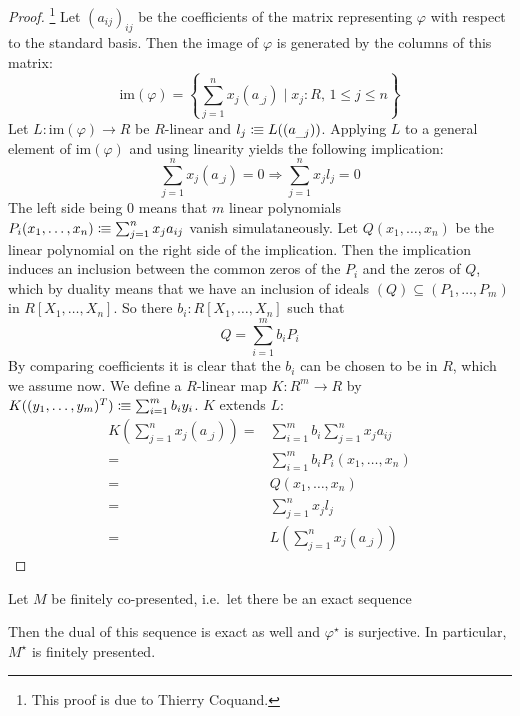 \begin{proof}\footnote{This proof is due to Thierry Coquand.}
  Let $(a_{ij})_{ij}$ be the coefficients of the matrix representing  $\varphi$ with respect to the standard basis.
  Then the image of $\varphi$ is generated by the columns of this matrix:
  \[
    \mathrm{im}(\varphi)=\left\{\sum_{j=1}^n x_j(a_{\_j})\mid x_j:R\text{, $1\leq j \leq n$}\right\}
  \]
  Let $L:\mathrm{im}(\varphi)\to R$ be $R$-linear and $l_j\vcentcolon\mspace{-1.2mu}\equiv L((a_{\_j}))$.
  Applying $L$ to a general element of $\mathrm{im}(\varphi)$ and using linearity yields the following implication:
  \[
    \sum_{j=1}^n x_j(a_{\_j}) = 0 \Rightarrow \sum_{j=1}^n x_jl_j = 0
  \]
  The left side being 0 means that $m$ linear polynomials $P_i(x_1,\dots,x_n)\vcentcolon\mspace{-1.2mu}\equiv\sum_{j=1}^n x_ja_{ij} $ vanish simulataneously.
  Let $Q(x_1,\dots,x_n)$ be the linear polynomial on the right side of the implication.
  Then the implication induces an inclusion between the common zeros of the $P_i$ and the zeros of $Q$,
  which by duality means that we have an inclusion of ideals $(Q)\subseteq (P_1,\dots,P_m)$ in $R[X_1,\dots,X_n]$.
  So there $b_i:R[X_1,\dots,X_n]$ such that
  \[
     Q = \sum_{i=1}^m b_iP_i
   \]
   By comparing coefficients it is clear that the $b_i$ can be chosen to be in $R$, which we assume now.
   We define a $R$-linear map $K:R^m\to R$ by $K((y_1,\dots,y_m)^T)\vcentcolon\mspace{-1.2mu}\equiv\sum_{i=1}^m b_iy_i$.
   $K$ extends $L$:
   \begin{align*}
     K\left(\sum_{j=1}^n x_j(a_{\_j})\right)=&\sum_{i=1}^m b_i\sum_{j=1}^n x_ja_{ij} \\
     =& \sum_{i=1}^m b_iP_i(x_1,\dots,x_n) \\
     =& Q(x_1,\dots,x_n) \\
     =& \sum_{j=1}^n x_jl_j \\
     =& L\left(\sum_{j=1}^n x_j(a_{\_j})\right)
   \end{align*}
\end{proof}

\begin{lemma}
  \label{dual-of-fcop-fp}
  Let $M$ be finitely co-presented, i.e.\ let there be an exact sequence
  \begin{center}
  \end{center}
  Then the dual of this sequence is exact as well and $\varphi^\star$ is surjective.
  In particular, $M^\star$ is finitely presented.
\end{lemma}

